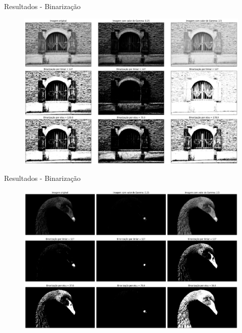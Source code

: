 \documentclass[]{beamer}
\begin{document}
\begin{frame}{Resultados - Binarização}
    \begin{figure}
        \includegraphics[scale=0.23]{Imagens/resultados-binarizacao-shutters.png}
    \end{figure}  
\end{frame}

\begin{frame}{Resultados - Binarização}
    \begin{figure}
        \includegraphics[scale=0.23]{Imagens/resultados-binarizacao-swan.png}
    \end{figure}  
\end{frame}
\end{document}
